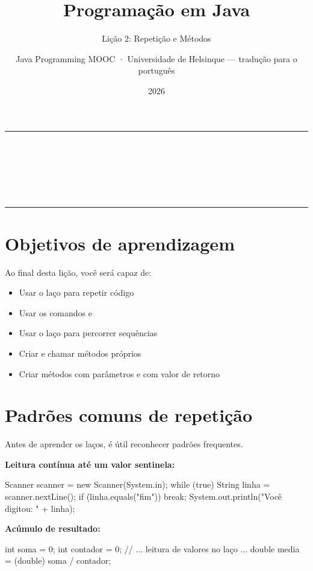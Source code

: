 \documentclass[11pt,a4paper]{article}
\title{Programação em Java}
\subtitle{Lição 2: Repetição e Métodos}
\author{Java Programming MOOC · Universidade de Helsinque — tradução para o português}
\date{2026}
\makeatletter
\renewcommand{\maketitle}{%
  \begin{center}
    {\color{javaRule}\rule{\linewidth}{1pt}}\\[6pt]
    {\Huge\sffamily\bfseries\color{javaOrange} \@title}\\[6pt]
    \ifx\@subtitle\undefined\else
      {\Large\sffamily\color{javaDeep} \@subtitle}\\[4pt]
    \fi
    {\small\sffamily\color{gray} \@author}\\[2pt]
    {\small\sffamily\color{gray} \@date}\\[6pt]
    {\color{javaRule}\rule{\linewidth}{1pt}}
  \end{center}
  \vspace{1em}
}
\makeatother
\begin{document}
\maketitle
\tableofcontents
\vspace{1.5em}

\section{Objetivos de aprendizagem}

Ao final desta lição, você será capaz de:

\begin{itemize}
  \item Usar o laço  para repetir código
  \item Usar os comandos  e 
  \item Usar o laço  para percorrer sequências
  \item Criar e chamar métodos próprios
  \item Criar métodos com parâmetros e com valor de retorno
\end{itemize}

\section{Padrões comuns de repetição}

Antes de aprender os laços, é útil reconhecer padrões frequentes.

\textbf{Leitura contínua até um valor sentinela:}

\begin{javacode}
Scanner scanner = new Scanner(System.in);
while (true) {
    String linha = scanner.nextLine();
    if (linha.equals("fim")) {
        break;
    }
    System.out.println("Você digitou: " + linha);
}
\end{javacode}

\textbf{Acúmulo de resultado:}

\begin{javacode}
int soma = 0;
int contador = 0;
// ... leitura de valores no laço ...
double media = (double) soma / contador;
\end{javacode}

\end{document}
